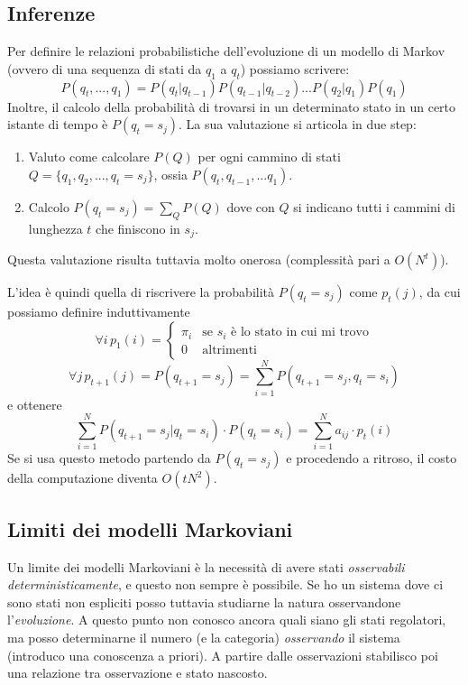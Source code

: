 \documentclass[a4paper,oneside,titlepage]{book}
\begin{document}
\subsection{Inferenze}
Per definire le relazioni probabilistiche dell'evoluzione di un modello di Markov (ovvero di una sequenza di stati da $q_1$ a $q_t$) possiamo scrivere:
\[ P(q_t,...,q_1) = P(q_t|q_{t-1}) P(q_{t-1}|q_{t-2}) ... P(q_2|q_1) P(q_1) \]
Inoltre, il calcolo della probabilità di trovarsi in un determinato stato in un certo istante di tempo è $P(q_t=s_j)$. La sua valutazione si articola in due step:
\begin{enumerate}
    \item Valuto come calcolare $P(Q)$ per ogni cammino di stati $Q = \{ q_1, q_2, ..., q_t=s_j \}$, ossia $P(q_t, q_{t-1}, ... q_1)$.
    \item Calcolo $P(q_t=s_j) = \sum_Q P(Q)$ dove con $Q$ si indicano tutti i cammini di lunghezza $t$ che finiscono in $s_j$.
\end{enumerate}
Questa valutazione risulta tuttavia molto onerosa (complessità pari a $O(N^t)$).

L'idea è quindi quella di riscrivere la probabilità $P(q_t=s_j)$ come $p_t(j)$, da cui possiamo definire induttivamente
\[ \forall i \, p_1(i) =
    \begin{cases}
	\pi_i & \text{se $s_i$ è lo stato in cui mi trovo} \\
	0 & \text{altrimenti}
	\end{cases} \]
\[ \forall j \, p_{t+1}(j) = P(q_{t+1}=s_j) = \sum_{i=1}^N P(q_{t+1}=s_j, q_t=s_i) \]
e ottenere
\[ \sum_{i=1}^N P(q_{t+1}=s_j | q_t=s_i) \cdot P(q_t=s_i) = \sum_{i=1}^N a_{ij} \cdot p_t(i) \]
Se si usa questo metodo partendo da $P(q_t=s_j)$ e procedendo a ritroso, il costo della computazione diventa $O(tN^2)$.

\subsection{Limiti dei modelli Markoviani}
Un limite dei modelli Markoviani è la necessità di avere stati \textit{osservabili deterministicamente}, e questo non sempre è possibile. Se ho un sistema dove ci sono stati non espliciti posso tuttavia studiarne la natura osservandone l'\textit{evoluzione}. A questo punto non conosco ancora quali siano gli stati regolatori, ma posso determinarne il
numero (e la categoria) \textit{osservando} il sistema (introduco una conoscenza a priori). A partire dalle osservazioni stabilisco poi una relazione tra osservazione e stato nascosto.
\end{document}
